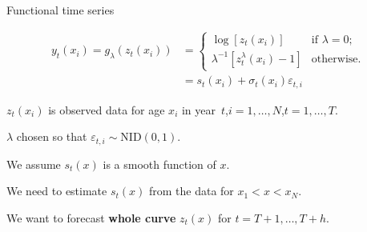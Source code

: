 \documentclass[14pt]{beamer}
\begin{document}
\begin{frame}{Functional time series}

\begin{block}{}\vspace*{-0.6cm}
\begin{align*}
y_t(x_i) = g_{\lambda}(z_t(x_i)) &= \begin{cases}
\log[z_t(x_i)] & \text{if $\lambda=0$;}\\
\lambda^{-1}\left[z_t^\lambda(x_i) -1\right]  & \text{otherwise}.
\end{cases} \\
 &= s_t(x_i) + \sigma_t(x_i)\varepsilon_{t,i}
\end{align*}
\end{block}
\biz
\item $z_t(x_i)$ is observed data for age $x_i$ in year~$t$,\quad $i=1,\dots,N$,\quad $t=1,\dots,T$. 
\item $\lambda$ chosen so that $\varepsilon_{t,i}\sim\text{NID}(0,1)$.
\item We assume $s_t(x)$ is a smooth function of $x$.

\item We need to estimate $s_t(x)$ from the data for $x_1 < x < x_N$.

\item We want to forecast \textbf{\alert{whole curve}} $z_{t}(x)$ for $t=T+1,\dots,T+h$.
\eiz

\end{frame}

%
%
%
%
%
%
%
%
%
\end{document}
